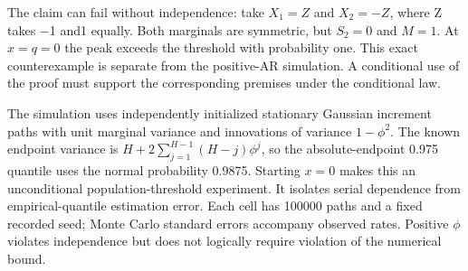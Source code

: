 \documentclass[11pt,a4paper]{article}
\begin{document}
The claim can fail without independence: take \(X_1=Z\) and \(X_2=-Z\), where Z takes \(-\)1 and1 equally. Both marginals are symmetric, but \(S_2=0\) and \(M=1\). At \(x=q=0\) the peak exceeds the threshold with probability one. This exact counterexample is separate from the positive-AR simulation. A conditional use of the proof must support the corresponding premises under the conditional law.

The simulation uses independently initialized stationary Gaussian increment paths with unit marginal variance and innovations of variance \(1-\phi^2\). The known endpoint variance is \(H+2\sum_{j=1}^{H-1}(H-j)\phi^j\), so the absolute-endpoint 0.975 quantile uses the normal probability 0.9875. Starting \(x=0\) makes this an unconditional population-threshold experiment. It isolates serial dependence from empirical-quantile estimation error. Each cell has 100000 paths and a fixed recorded seed; Monte Carlo standard errors accompany observed rates. Positive \(\phi\) violates independence but does not logically require violation of the numerical bound.
\end{document}
